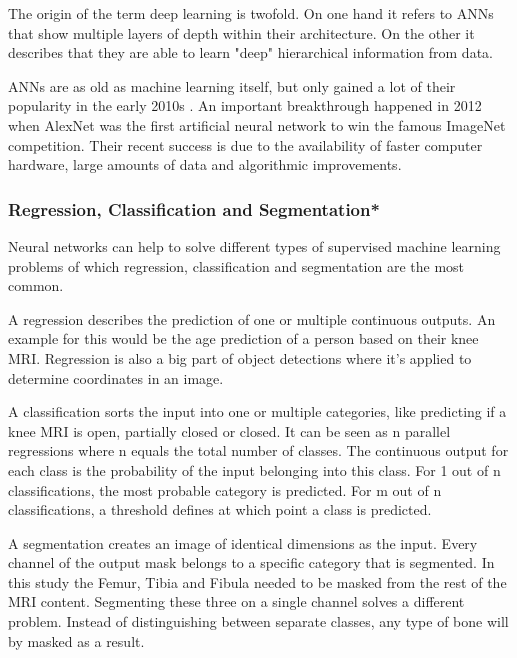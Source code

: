 The origin of the term deep learning is twofold. On one hand it refers to ANNs that show multiple layers of depth within their architecture. On the other it describes that they are able to learn "deep" hierarchical information from data.

ANNs are as old as machine learning itself, but only gained a lot of their popularity in the early 2010s \cite{Chollet2017}. An important breakthrough happened in 2012 when AlexNet\cite{Krizhevsky} was the first artificial neural network to win the famous ImageNet competition. Their recent success is due to the availability of faster computer hardware, large amounts of data and algorithmic improvements.





\subsubsection{Regression, Classification and Segmentation*}

Neural networks can help to solve different types of supervised machine learning problems of which regression, classification and segmentation are the most common.

A regression describes the prediction of one or multiple continuous outputs. An example for this would be the age prediction of a person based on their knee MRI. Regression is also a big part of object detections where it's applied to determine coordinates in an image.

A classification sorts the input into one or multiple categories, like predicting if a knee MRI is open, partially closed or closed. It can be seen as n parallel regressions where n equals the total number of classes. The continuous output for each class is the probability of the input belonging into this class. For 1 out of n classifications, the most probable category is predicted. For m out of n classifications, a threshold defines at which point a class is predicted.

A segmentation creates an image of identical dimensions as the input. Every channel of the output mask belongs to a specific category that is segmented. In this study the Femur, Tibia and Fibula needed to be masked from the rest of the MRI content. Segmenting these three on a single channel solves a different problem. Instead of distinguishing between separate classes, any type of bone will by masked as a result.

\newpage